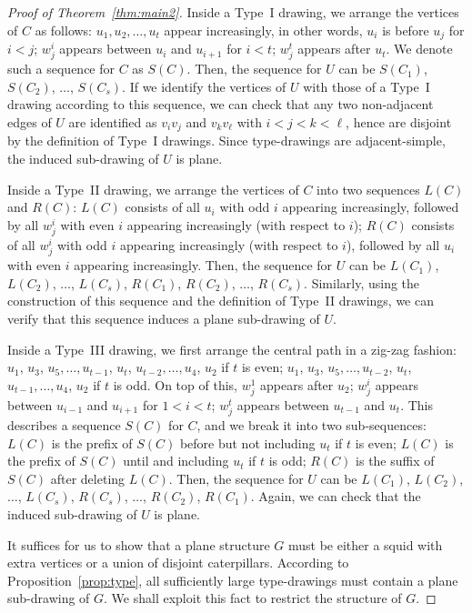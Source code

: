 \documentclass[a4paper,UKenglish,cleveref, autoref, thm-restate]{lipics_arxiv}
\begin{document}
\begin{proof}[Proof of Theorem~\ref{thm:main2}]
    Inside a Type~I drawing, we arrange the vertices of $C$ as follows: $u_1,u_2,\dots,u_t$ appear increasingly, in other words, $u_i$ is before $u_j$ for $i<j$; $w^i_j$ appears between $u_i$ and $u_{i+1}$ for $i<t$; $w^t_j$ appears after $u_t$. We denote such a sequence for $C$ as $S(C)$. Then, the sequence for $U$ can be $S(C_1)$, $S(C_2)$, $\dots$, $S(C_s)$. If we identify the vertices of $U$ with those of a Type~I drawing according to this sequence, we can check that any two non-adjacent edges of $U$ are identified as $v_iv_j$ and $v_kv_\ell$ with $i<j<k<\ell$, hence are disjoint by the definition of Type~I drawings. Since type-drawings are adjacent-simple, the induced sub-drawing of $U$ is plane.

    Inside a Type~II drawing, we arrange the vertices of $C$ into two sequences $L(C)$ and $R(C)$: $L(C)$ consists of all $u_i$ with odd $i$ appearing increasingly, followed by all $w^i_j$ with even $i$ appearing increasingly (with respect to $i$); $R(C)$ consists of all $w^i_j$ with odd $i$ appearing increasingly (with respect to $i$), followed by all $u_i$ with even $i$ appearing increasingly. Then, the sequence for $U$ can be $L(C_1)$, $L(C_2)$, $\dots$, $L(C_s)$, $R(C_1)$, $R(C_2)$, $\dots$, $R(C_s)$. Similarly, using the construction of this sequence and the definition of Type~II drawings, we can verify that this sequence induces a plane sub-drawing of $U$.
    
    Inside a Type~III drawing, we first arrange the central path in a zig-zag fashion: $u_1$, $u_3$, $u_5,\dots,u_{t-1}$, $u_{t}$, $u_{t-2},\dots,u_4$, $u_2$ if $t$ is even; $u_1$, $u_3$, $u_5,\dots,u_{t-2}$, $u_{t}$, $u_{t-1},\dots,u_4$, $u_2$ if $t$ is odd. On top of this, $w^1_j$ appears after $u_2$; $w^i_j$ appears between $u_{i-1}$ and $u_{i+1}$ for $1<i<t$; $w^t_j$ appears between $u_{t-1}$ and $u_t$. This describes a sequence $S(C)$ for $C$, and we break it into two sub-sequences: $L(C)$ is the prefix of $S(C)$ before but not including $u_t$ if $t$ is even; $L(C)$ is the prefix of $S(C)$ until and including $u_t$ if $t$ is odd; $R(C)$ is the suffix of $S(C)$ after deleting $L(C)$. Then, the sequence for $U$ can be $L(C_1)$, $L(C_2)$, $\dots$, $L(C_s)$, $R(C_s)$, $\dots$, $R(C_2)$, $R(C_1)$. Again, we can check that the induced sub-drawing of $U$ is plane.

    It suffices for us to show that a plane structure $G$ must be either a squid with extra vertices or a union of disjoint caterpillars. According to Proposition~\ref{prop:type}, all sufficiently large type-drawings must contain a plane sub-drawing of $G$. We shall exploit this fact to restrict the structure of $G$.


\end{proof}
\end{document}
